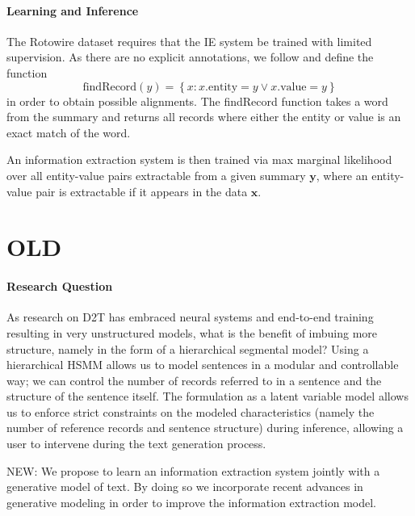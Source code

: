 \documentclass[11pt]{article}
\newcommand\set[1]{\left\{#1\right\}}
\newcommand{\bx}{\mathbf{x}}
\newcommand{\by}{\mathbf{y}}
\begin{document}
\paragraph{Learning and Inference}
The Rotowire dataset requires that the IE system be trained with limited supervision.
As there are no explicit annotations, we follow \citep{wiseman2017d2t} and define the function
\begin{equation}
\text{findRecord}(y) = \set{ x : x.\text{entity} = y \vee x.\text{value} = y}
\end{equation}
in order to obtain possible alignments.
The findRecord function takes a word from the summary and returns all records where
either the entity or value is an exact match of the word.

An information extraction system is then trained via max marginal likelihood over
all entity-value pairs extractable from a given summary $\by$,
where an entity-value pair is extractable if it appears in the data $\bx$.

\section{OLD}

\paragraph{Research Question}
As research on D2T has embraced neural systems and end-to-end training resulting
in very unstructured models, what is the benefit of imbuing more structure, namely in the
form of a hierarchical segmental model?
Using a hierarchical HSMM allows us to model
sentences in a modular and controllable way;
we can control the number of records referred to in a sentence and 
the structure of the sentence itself.
The formulation as a latent variable model allows us to enforce strict constraints on
the modeled characteristics (namely the number of reference records and sentence structure)
during inference, allowing a user to intervene during the text generation process.

NEW: We propose to learn an information extraction system jointly with a 
generative model of text.
By doing so we incorporate recent advances in generative modeling
in order to improve the information extraction model.
\end{document}
